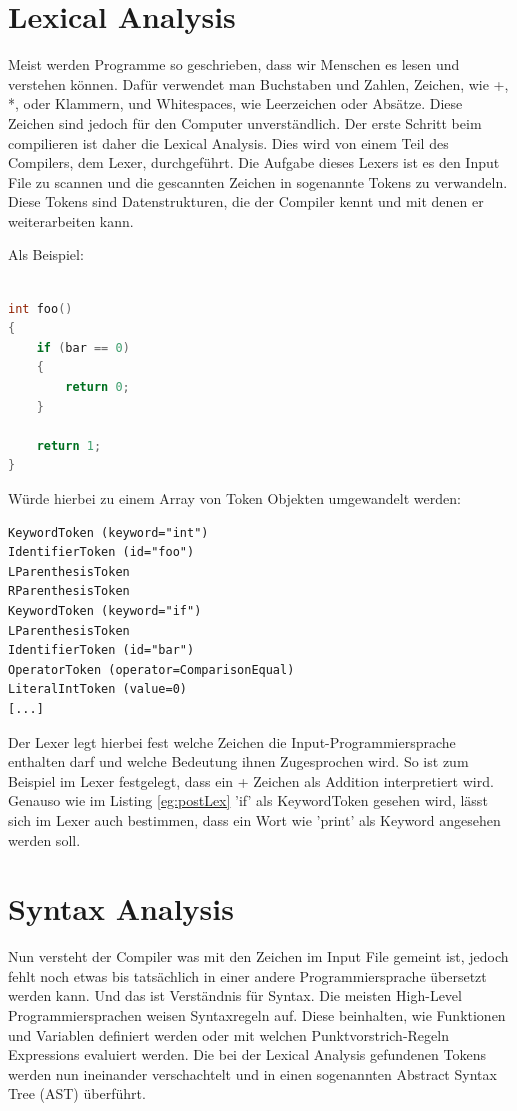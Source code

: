 \section{Lexical Analysis}
Meist werden Programme so geschrieben, dass wir Menschen es lesen und verstehen können. Dafür verwendet man Buchstaben und Zahlen, Zeichen, wie +, *, oder Klammern, und Whitespaces, wie Leerzeichen oder Absätze.
Diese Zeichen sind jedoch für den Computer unverständlich. Der erste Schritt beim compilieren ist daher die Lexical Analysis. Dies wird von einem Teil des Compilers, dem Lexer, durchgeführt.
Die Aufgabe dieses Lexers ist es den Input File zu scannen und die gescannten Zeichen in sogenannte Tokens zu verwandeln. Diese Tokens sind Datenstrukturen, die der Compiler kennt und mit denen er weiterarbeiten kann.

Als Beispiel:

\begin{lstlisting}[language=C, label=eg:preLex, caption=C code vor Lexical Analysis]

int foo()
{
    if (bar == 0)
    {
        return 0;
    }

    return 1;
}

\end{lstlisting}

Würde hierbei zu einem Array von Token Objekten umgewandelt werden:

\begin{lstlisting}[label=eg:postLex, caption=Tokens nach Lexical Analysis]
KeywordToken (keyword="int")
IdentifierToken (id="foo")
LParenthesisToken
RParenthesisToken
KeywordToken (keyword="if")
LParenthesisToken
IdentifierToken (id="bar")
OperatorToken (operator=ComparisonEqual)
LiteralIntToken (value=0)
[...]
\end{lstlisting}

Der Lexer legt hierbei fest welche Zeichen die Input-Programmiersprache enthalten darf und welche Bedeutung ihnen Zugesprochen wird. So ist zum Beispiel im Lexer festgelegt, dass ein + Zeichen als Addition interpretiert wird.
Genauso wie im Listing \ref{eg:postLex} 'if' als KeywordToken gesehen wird, lässt sich im Lexer auch bestimmen, dass ein Wort wie 'print' als Keyword angesehen werden soll.

\section{Syntax Analysis}
Nun versteht der Compiler was mit den Zeichen im Input File gemeint ist, jedoch fehlt noch etwas bis tatsächlich in einer andere Programmiersprache übersetzt werden kann. Und das ist Verständnis für Syntax.
Die meisten High-Level Programmiersprachen weisen Syntaxregeln auf. Diese beinhalten, wie Funktionen und Variablen definiert werden oder mit welchen Punktvorstrich-Regeln Expressions evaluiert werden.
Die bei der Lexical Analysis gefundenen Tokens werden nun ineinander verschachtelt und in einen sogenannten Abstract Syntax Tree (AST) überführt.

